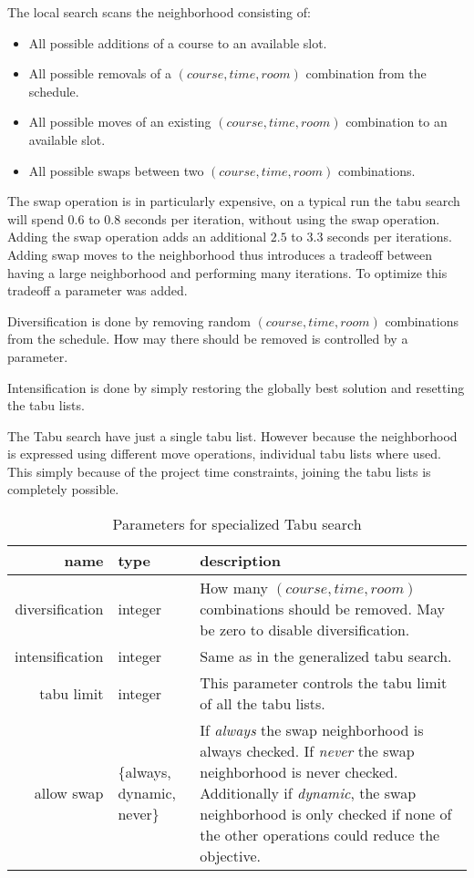 The local search scans the neighborhood consisting of:
\begin{itemize}
\item All possible additions of a course to an available slot.
\item All possible removals of a $(course, time, room)$ combination from the schedule.
\item All possible moves of an existing $(course, time, room)$ combination to an available slot.
\item All possible swaps between two $(course, time, room)$ combinations.
\end{itemize}

The swap operation is in particularly expensive, on a typical run the tabu search will spend $0.6$ to $0.8$ seconds per iteration, without using the swap operation. Adding the swap operation adds an additional $2.5$ to $3.3$ seconds per iterations. Adding swap moves to the neighborhood thus introduces a tradeoff between having a large neighborhood and performing many iterations. To optimize this tradeoff a parameter was added.

Diversification is done by removing random $(course, time, room)$ combinations from the schedule. How may there should be removed is controlled by a parameter.

Intensification is done by simply restoring the globally best solution and resetting the tabu lists.

The Tabu search have just a single tabu list. However because the neighborhood is expressed using different move operations, individual tabu lists where used. This simply because of the project time constraints, joining the tabu lists is completely possible.

\begin{table}[H]
\centering
\begin{tabular}{r|p{2cm}|p{6cm}}
	name & type & description \\ \hline
	diversification & integer & How many $(course, time, room)$ combinations should be removed. May be zero to disable diversification. \\
	intensification & integer & Same as in the generalized tabu search. \\
	tabu limit & integer & This parameter controls the tabu limit of all the tabu lists. \\
	allow swap & $\{$always, dynamic, never$\}$ & If \textit{always} the swap neighborhood is always checked. If \textit{never} the swap neighborhood is never checked. Additionally if \textit{dynamic}, the swap neighborhood is only checked if none of the other operations could reduce the objective.
\end{tabular}
\caption{Parameters for specialized Tabu search}
\end{table}


